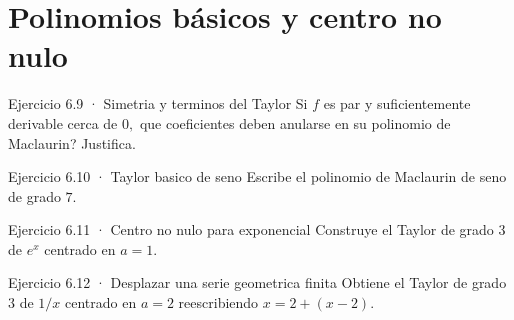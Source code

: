 \documentclass[10pt,a4paper,oneside,openany]{book}
\begin{document}
\section{Polinomios básicos y centro no nulo}
\begin{PSevenExerciseFixed}{Ejercicio 6.9 · Simetria y terminos del Taylor}
Si \(f\) es par y suficientemente derivable cerca de \(0,\) que coeficientes deben anularse en su polinomio de Maclaurin? Justifica.
\end{PSevenExerciseFixed}
\begin{PSevenExerciseFixed}{Ejercicio 6.10 · Taylor basico de seno}
Escribe el polinomio de Maclaurin de seno de grado \(7\).
\end{PSevenExerciseFixed}
\begin{PSevenExerciseFixed}{Ejercicio 6.11 · Centro no nulo para exponencial}
Construye el Taylor de grado \(3\) de \(e^x\) centrado en \(a=1\).
\end{PSevenExerciseFixed}
\begin{PSevenExerciseFixed}{Ejercicio 6.12 · Desplazar una serie geometrica finita}
Obtiene el Taylor de grado \(3\) de \(1/x\) centrado en \(a=2\) reescribiendo \(x=2+(x-2)\).
\end{PSevenExerciseFixed}
\end{document}
